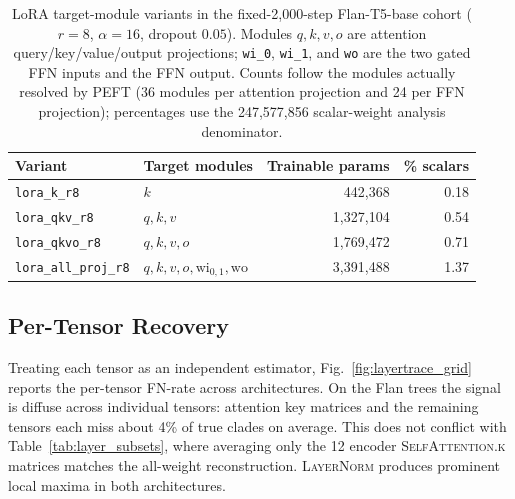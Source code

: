 \documentclass{article}
\theoremstyle{definition}
\theoremstyle{plain}
\begin{document}
\begin{table}[h]
\caption{LoRA target-module variants in the fixed-2,000-step Flan-T5-base cohort
($r=8$, $\alpha=16$, dropout $0.05$). Modules $q,k,v,o$ are attention
query/key/value/output projections; \texttt{wi\_0}, \texttt{wi\_1}, and \texttt{wo} are the two gated
FFN inputs and the FFN output. Counts follow the modules actually resolved by PEFT (36 modules per
attention projection and 24 per FFN projection); percentages use the 247,577,856 scalar-weight analysis
denominator.}
\label{tab:lora_variants}
\centering
\begin{tabular}{ll r r}
\toprule
Variant & Target modules & Trainable params & \% scalars \\
\midrule
\texttt{lora\_k\_r8}          & $k$                                  & 442,368   & 0.18 \\
\texttt{lora\_qkv\_r8}        & $q,k,v$                              & 1,327,104 & 0.54 \\
\texttt{lora\_qkvo\_r8}       & $q,k,v,o$                            & 1,769,472 & 0.71 \\
\texttt{lora\_all\_proj\_r8}  & $q,k,v,o,\mathrm{wi}_{0,1},\mathrm{wo}$ & 3,391,488 & 1.37 \\
\bottomrule
\end{tabular}
\end{table}

\subsection*{Per-Tensor Recovery}
\label{app:layertrace}
Treating each tensor as an independent estimator, Fig.~\ref{fig:layertrace_grid} reports the per-tensor
FN-rate across architectures. On the Flan trees the signal is diffuse across individual tensors:
attention key matrices and the remaining tensors each miss about 4\% of true clades on average. This
does not conflict with Table~\ref{tab:layer_subsets}, where averaging only the 12 encoder
\textsc{SelfAttention.k} matrices matches the all-weight reconstruction. \textsc{LayerNorm} produces
prominent local maxima in both architectures.
\end{document}
